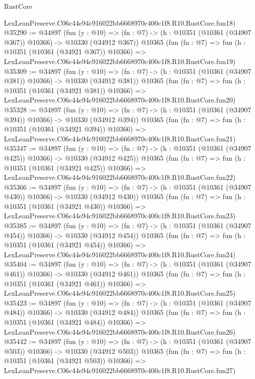 \begin{lexlean}{RustCore}
\begin{coremodule}
    LexLeanPreserve.C06c44e94c916022bb6668970c400c1f8.R10.RustCore.fun18)
@35290 := @34897
    (fun (y : @10) =>
    (fn : @7) -> (h : @10351 (@10361 (@34907 @367)) @10366) -> @10330 (@34912 @367))
    @10365
    (fun (fn : @7) =>
    fun (h : @10351 (@10361 (@34921 @367)) @10366) =>
    LexLeanPreserve.C06c44e94c916022bb6668970c400c1f8.R10.RustCore.fun19)
@35309 := @34897
    (fun (y : @10) =>
    (fn : @7) -> (h : @10351 (@10361 (@34907 @381)) @10366) -> @10330 (@34912 @381))
    @10365
    (fun (fn : @7) =>
    fun (h : @10351 (@10361 (@34921 @381)) @10366) =>
    LexLeanPreserve.C06c44e94c916022bb6668970c400c1f8.R10.RustCore.fun20)
@35328 := @34897
    (fun (y : @10) =>
    (fn : @7) -> (h : @10351 (@10361 (@34907 @394)) @10366) -> @10330 (@34912 @394))
    @10365
    (fun (fn : @7) =>
    fun (h : @10351 (@10361 (@34921 @394)) @10366) =>
    LexLeanPreserve.C06c44e94c916022bb6668970c400c1f8.R10.RustCore.fun21)
@35347 := @34897
    (fun (y : @10) =>
    (fn : @7) -> (h : @10351 (@10361 (@34907 @425)) @10366) -> @10330 (@34912 @425))
    @10365
    (fun (fn : @7) =>
    fun (h : @10351 (@10361 (@34921 @425)) @10366) =>
    LexLeanPreserve.C06c44e94c916022bb6668970c400c1f8.R10.RustCore.fun22)
@35366 := @34897
    (fun (y : @10) =>
    (fn : @7) -> (h : @10351 (@10361 (@34907 @430)) @10366) -> @10330 (@34912 @430))
    @10365
    (fun (fn : @7) =>
    fun (h : @10351 (@10361 (@34921 @430)) @10366) =>
    LexLeanPreserve.C06c44e94c916022bb6668970c400c1f8.R10.RustCore.fun23)
@35385 := @34897
    (fun (y : @10) =>
    (fn : @7) -> (h : @10351 (@10361 (@34907 @454)) @10366) -> @10330 (@34912 @454))
    @10365
    (fun (fn : @7) =>
    fun (h : @10351 (@10361 (@34921 @454)) @10366) =>
    LexLeanPreserve.C06c44e94c916022bb6668970c400c1f8.R10.RustCore.fun24)
@35404 := @34897
    (fun (y : @10) =>
    (fn : @7) -> (h : @10351 (@10361 (@34907 @461)) @10366) -> @10330 (@34912 @461))
    @10365
    (fun (fn : @7) =>
    fun (h : @10351 (@10361 (@34921 @461)) @10366) =>
    LexLeanPreserve.C06c44e94c916022bb6668970c400c1f8.R10.RustCore.fun25)
@35423 := @34897
    (fun (y : @10) =>
    (fn : @7) -> (h : @10351 (@10361 (@34907 @484)) @10366) -> @10330 (@34912 @484))
    @10365
    (fun (fn : @7) =>
    fun (h : @10351 (@10361 (@34921 @484)) @10366) =>
    LexLeanPreserve.C06c44e94c916022bb6668970c400c1f8.R10.RustCore.fun26)
@35442 := @34897
    (fun (y : @10) =>
    (fn : @7) -> (h : @10351 (@10361 (@34907 @503)) @10366) -> @10330 (@34912 @503))
    @10365
    (fun (fn : @7) =>
    fun (h : @10351 (@10361 (@34921 @503)) @10366) =>
    LexLeanPreserve.C06c44e94c916022bb6668970c400c1f8.R10.RustCore.fun27)

\end{coremodule}
\end{lexlean}
